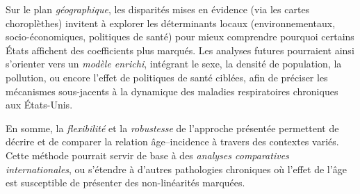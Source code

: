 Sur le plan \emph{géographique}, les disparités mises en évidence (via les cartes choroplèthes) invitent à explorer les déterminants locaux (environnementaux, socio-économiques, politiques de santé) pour mieux comprendre pourquoi certains États affichent des coefficients plus marqués. Les analyses futures pourraient ainsi s’orienter vers un \emph{modèle enrichi}, intégrant le sexe, la densité de population, la pollution, ou encore l’effet de politiques de santé ciblées, afin de préciser les mécanismes sous-jacents à la dynamique des maladies respiratoires chroniques aux États-Unis.

En somme, la \emph{flexibilité} et la \emph{robustesse} de l’approche présentée permettent de décrire et de comparer la relation âge–incidence à travers des contextes variés. Cette méthode pourrait servir de base à des \emph{analyses comparatives internationales}, ou s’étendre à d’autres pathologies chroniques où l’effet de l’âge est susceptible de présenter des non-linéarités marquées.



